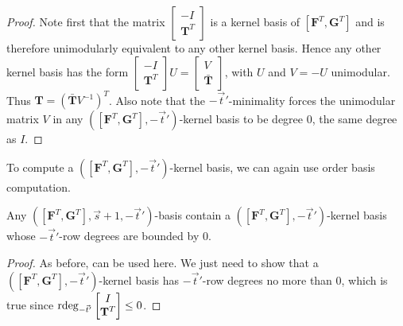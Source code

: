 \begin{proof}
Note first that the matrix $\begin{bmatrix}-I\\
\mathbf{T}^{T}
\end{bmatrix}$ is a kernel basis of $\left[\mathbf{F}^{T},\mathbf{G}^{T}\right]$
and is therefore unimodularly equivalent to any other kernel basis.
Hence any other kernel basis has the form $\begin{bmatrix}-I\\
\mathbf{T}^{T}
\end{bmatrix}U=\begin{bmatrix}V\\
\bar{\mathbf{T}}
\end{bmatrix}$, with $U$ and $V=-U$ unimodular. Thus $\mathbf{T}=\left(\bar{\mathbf{T}}V^{-1}\right)^{T}$.
Also note that the $-\vec{t}'$-minimality forces the unimodular matrix
$V$ in any $\left(\left[\mathbf{F}^{T},\mathbf{G}^{T}\right],-\vec{t}'\right)$-kernel
basis to be degree 0, the same degree as $I$.
\end{proof}
To compute a $\left(\left[\mathbf{F}^{T},\mathbf{G}^{T}\right],-\vec{t}'\right)$-kernel
basis, we can again use order basis computation.
\begin{lem}
Any $\left(\left[\mathbf{F}^{T},\mathbf{G}^{T}\right],\vec{s}+1,-\vec{t}'\right)$-basis
contain a $\left(\left[\mathbf{F}^{T},\mathbf{G}^{T}\right],-\vec{t}'\right)$-kernel
basis whose $-\vec{t}'$-row degrees are bounded by 0.\end{lem}
\begin{proof}
As before, 
can be used here. We just need to show that a $\left(\left[\mathbf{F}^{T},\mathbf{G}^{T}\right],-\vec{t}'\right)$-kernel
basis has $-\vec{t}'$-row degrees no more than 0, which is true since
$\rdeg_{-\vec{t}'}\begin{bmatrix}I\\
\mathbf{T}^{T}
\end{bmatrix}\le0$.\end{proof}

